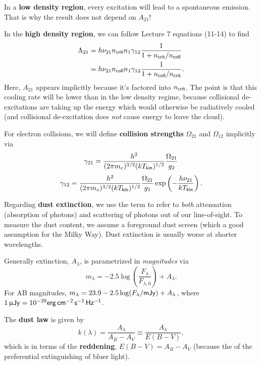 \documentclass{tufte-handout}
\renewcommand{\textbf}[1]{{\bf \textcolor{dark-gray}{#1}}}
\renewcommand{\rm}{\sf}
\newcommand{\m}{\upmu} %
\begin{document}
In a \textbf{low density region}, every excitation will lead to a spontaneous emission. That is why the result does not depend on $A_{21}$!

In the \textbf{high density region}, we can follow Lecture 7 equations (11-14) to find
\begin{align}\label{eq:high density cooling}
\Lambda_{21} &= h\nu_{21} n_{\rm crit} n_1 \gamma_{12} \frac{1}{1+ n_{\rm crit}/ n_{\rm coll}}\\
& =h\nu_{21} n_{\rm coll} n_1 \gamma_{12} \frac{1}{1+ n_{\rm coll}/ n_{\rm crit}}.
\end{align}
Here, $A_{21}$ appears implicitly because it's factored into $n_{\rm crit}$. The point is that this cooling rate will be lower than in the low density regime, because collisional de-excitations are taking up the energy which would otherwise be radiatively cooled (and collisional de-excitation does \textit{not} cause energy to leave the cloud).

For electron collisions, we will define \textbf{collision strengths} $\Omega_{21}$ and $\Omega_{12}$ implicitly via
\begin{equation}
\gamma_{21} = \frac{h^2}{(2\pi m_e)^{3/2} (kT_{\rm kin})^{1/2}} \frac{\Omega_{21}}{g_2}
\end{equation}
\begin{equation}
\gamma_{12} = \frac{h^2}{(2\pi m_e)^{3/2} (kT_{\rm kin})^{1/2}} \frac{\Omega_{21}}{g_1}\exp\left (- \frac{h\nu_{21}}{kT_{\rm kin}}\right ).
\end{equation}

Regarding \textbf{dust extinction}, we use the term to refer to \textit{both} attenuation (absorption of photons) and scattering of photons out of our line-of-sight. To measure the dust content, we assume a foreground dust screen (which a good assumption for the Milky Way). Dust extinction is usually worse at shorter wavelengths.

Generally extinction, $A_\lambda$, is parametrized in \textit{magnitudes} via
\begin{equation}
m_\lambda = -2.5 \log\left (\frac{F_\lambda}{F_{\lambda, 0}}\right ) + A_{\lambda}.
\end{equation}
For AB magnitudes, $m_{\lambda} = 23.9 - 2.5 \log (F_\lambda / {\rm mJy}) + A_\lambda$, where $1 \,  {\rm \m Jy} = 10^{-29} {\rm erg\, cm^{-2}\, s^{-1}\, Hz^{-1}}$.

The \textbf{dust law} is given by
\begin{equation}
k(\lambda) = \frac{A_{\lambda}}{A_B - A_V} \equiv \frac{A_\lambda}{E(B-V)},
\end{equation}
which is in terms of the \textbf{reddening}, $E(B-V) = A_B - A_V$ (because the of the preferential extinguishing of bluer light).
\end{document}
